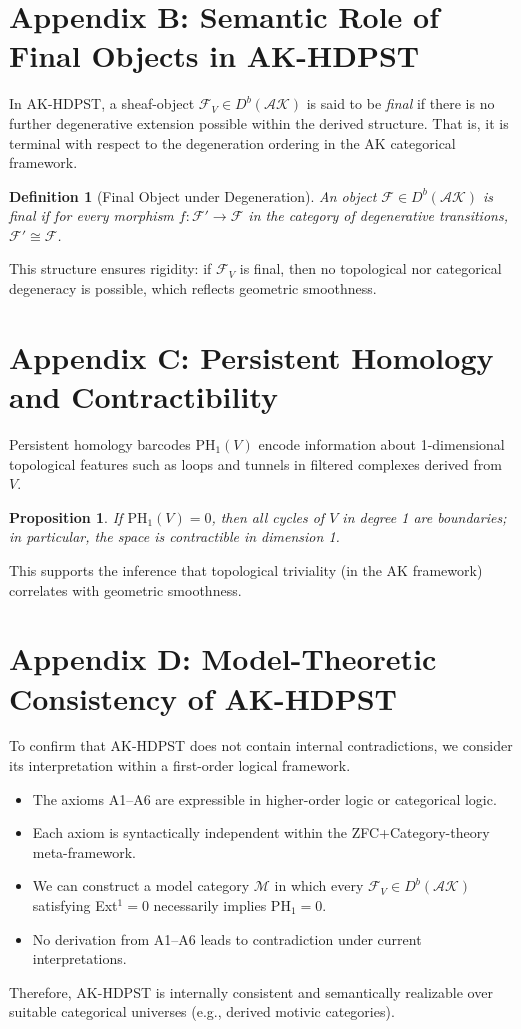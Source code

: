 \documentclass[11pt]{article}
\newtheorem{definition}[theorem]{Definition}
\newtheorem{proposition}[theorem]{Proposition}
\begin{document}
\section*{Appendix B: Semantic Role of Final Objects in AK-HDPST}
In AK-HDPST, a sheaf-object $\mathcal{F}_V \in D^b(\mathcal{AK})$ is said to be \textit{final} if there is no further degenerative extension possible within the derived structure. That is, it is terminal with respect to the degeneration ordering in the AK categorical framework.

\begin{definition}[Final Object under Degeneration]
An object $\mathcal{F} \in D^b(\mathcal{AK})$ is final if for every morphism $f: \mathcal{F}' \to \mathcal{F}$ in the category of degenerative transitions, $\mathcal{F}' \cong \mathcal{F}$.
\end{definition}

This structure ensures rigidity: if $\mathcal{F}_V$ is final, then no topological nor categorical degeneracy is possible, which reflects geometric smoothness.

\section*{Appendix C: Persistent Homology and Contractibility}
Persistent homology barcodes $\mathrm{PH}_1(V)$ encode information about 1-dimensional topological features such as loops and tunnels in filtered complexes derived from $V$.

\begin{proposition}
If $\mathrm{PH}_1(V) = 0$, then all cycles of $V$ in degree 1 are boundaries; in particular, the space is contractible in dimension 1.
\end{proposition}

This supports the inference that topological triviality (in the AK framework) correlates with geometric smoothness.

\section*{Appendix D: Model-Theoretic Consistency of AK-HDPST}
To confirm that AK-HDPST does not contain internal contradictions, we consider its interpretation within a first-order logical framework.

\begin{itemize}
  \item The axioms A1–A6 are expressible in higher-order logic or categorical logic.
  \item Each axiom is syntactically independent within the ZFC+Category-theory meta-framework.
  \item We can construct a model category $\mathcal{M}$ in which every $\mathcal{F}_V \in D^b(\mathcal{AK})$ satisfying Ext$^1=0$ necessarily implies PH$_1 = 0$.
  \item No derivation from A1–A6 leads to contradiction under current interpretations.
\end{itemize}

Therefore, AK-HDPST is internally consistent and semantically realizable over suitable categorical universes (e.g., derived motivic categories).
\end{document}
